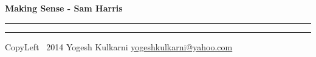 

\usepackage{beamerarticle} %



\begin{center}
     \Large{\textbf{Making Sense - Sam Harris}}  %
\end{center}
\rule{\linewidth}{0.25pt}
\raggedright
\footnotesize
\begin{multicols}{3}




\rule{0.3\linewidth}{0.25pt}

\scriptsize
CopyLeft \textcopyleft\ 2014 Yogesh Kulkarni
\href{http://www.yogeshkulkarni.com}{yogeshkulkarni@yahoo.com}

\end{multicols}

